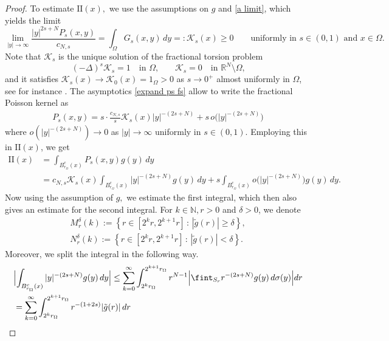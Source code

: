 \documentclass[notitlepage,11pt,reqno]{amsart}
\theoremstyle{definition}
\numberwithin{equation}{section}
\newcommand{\RR}{\mathds{R}}
\begin{document}
\begin{proof}
\vspace{.5cm}
 To estimate $\mathrm{II}(x),$ we use the assumptions on $g$ and \cref{a limit}, which yields the limit
\begin{equation}\label{expand ps fs}
    \lim_{|y|\to \infty}\frac{|y|^{2s+N}P_s(x, y)}{c_{N, s}}= \int_{\Omega}G_s(x, y)\, dy=:\mathcal{K}_s(x) \geq 0 \qquad \text{uniformly in $s \in (0,1)$ and $x \in \Omega$.}
\end{equation}
Note that $\mathcal{K}_s$ is the unique solution of the fractional torsion problem
$$
(-\Delta)^s \mathcal{K}_s =1 \quad \text{in $\Omega$,}\qquad
\mathcal{K}_s  = 0\quad \text{in $\RR^N \setminus \Omega$,}
$$
and it satisfies $\mathcal{K}_s(x) \to \mathcal{K}_0(x) =1_{\Omega}>0$ as $s\to 0^+$ almost uniformly in $\Omega$, see for instance \cite[Remark 3.8]{JSW20}.
The asymptotics \eqref{expand ps fs} allow to write the fractional Poisson kernel as
\begin{align*}
    P_s(x, y)= s\cdot\frac{c_{N,s}}{s}\mathcal{K}_s(x)|y|^{-(2s+N)}+s\, o\bigl(|y|^{-(2s+N)}\bigr)
\end{align*}
where $o(|y|^{-(2s+N)}) \to 0$ as $|y|\to \infty$ uniformly in $s\in (0, 1)$. 
Employing this in $\mathrm{II}(x)$, we get
\begin{align}\label{second estimate}
\mathrm{II}(x)&=\int_{B^c_{r_{\Omega}}(x)}P_s(x, y)g(y)\, dy\nonumber\\
&=c_{N, s}\mathcal{K}_s(x) \int_{B^c_{r_{\Omega}}(x)} |y|^{-(2s+N)}g(y)\, dy+ s \int_{B^c_{r_{\Omega}}(x)}o\bigl(|y|^{-(2s+N)}\bigr)g(y)\, dy.
\end{align}
Now using the assumption of $g,$ we estimate the first integral, which then also gives an estimate for the second integral. For $k \in \mathbb{N},r>0$ and $\delta>0$, we denote
\begin{align*}
M^{\delta}_{r}(k):=\left\{r\in [2^k r, 2^{k+1}r]\,:\,|\tilde{g}(r)|\geq \delta\right\},\\
N^{\delta}_{r}(k):=\left\{r\in [2^k r, 2^{k+1}r]\,:\,|\tilde{g}(r)|<\delta\right\}.
\end{align*}
Moreover, we split the integral in the following way.
\begin{align*}
&\Bigl|\int_{B^c_{r_{\Omega}}(x)}|y|^{-(2s+N)}g(y)\, dy\Bigr| \le \sum_{k=0}^{\infty}\int_{2^k r_{\Omega}}^{2^{k+1}r_{\Omega}} r^{N-1}\Bigl|\fint_{S_r}r^{-(2s+N)}g(y)\, d\sigma(y)\Bigr| dr\\
&= \sum_{k=0}^{\infty}\int_{2^k r_{\Omega}}^{2^{k+1}r_{\Omega}}  r^{-(1+2s)}|\tilde{g}(r)|\, dr\\

\end{align*}
\end{proof}
\end{document}
